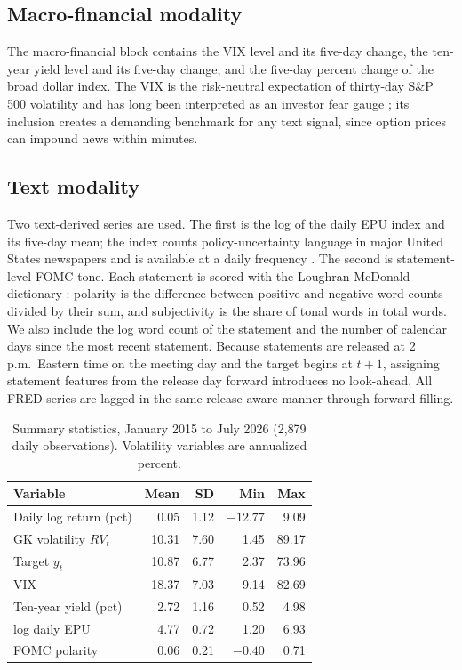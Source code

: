\documentclass[10pt,twocolumn]{article}
\begin{document}
\subsection{Macro-financial modality}
The macro-financial block contains the VIX level and its five-day change, the ten-year yield level and its five-day change, and the five-day percent change of the broad dollar index. The VIX is the risk-neutral expectation of thirty-day S\&P 500 volatility and has long been interpreted as an investor fear gauge \cite{whaley2000}; its inclusion creates a demanding benchmark for any text signal, since option prices can impound news within minutes.

\subsection{Text modality}
Two text-derived series are used. The first is the log of the daily EPU index and its five-day mean; the index counts policy-uncertainty language in major United States newspapers and is available at a daily frequency \cite{baker2016}. The second is statement-level FOMC tone. Each statement is scored with the Loughran-McDonald dictionary \cite{loughran2011}: polarity is the difference between positive and negative word counts divided by their sum, and subjectivity is the share of tonal words in total words. We also include the log word count of the statement and the number of calendar days since the most recent statement. Because statements are released at 2 p.m.\ Eastern time on the meeting day and the target begins at $t+1$, assigning statement features from the release day forward introduces no look-ahead. All FRED series are lagged in the same release-aware manner through forward-filling.

\begin{table}[t]
\centering\small
\caption{Summary statistics, January 2015 to July 2026 (2{,}879 daily observations). Volatility variables are annualized percent.}
\label{tab:summ}
\begin{tabular}{lrrrr}
\toprule
Variable & Mean & SD & Min & Max\\
\midrule
Daily log return (pct) & 0.05 & 1.12 & $-12.77$ & 9.09\\
GK volatility $RV_t$ & 10.31 & 7.60 & 1.45 & 89.17\\
Target $y_t$ & 10.87 & 6.77 & 2.37 & 73.96\\
VIX & 18.37 & 7.03 & 9.14 & 82.69\\
Ten-year yield (pct) & 2.72 & 1.16 & 0.52 & 4.98\\
log daily EPU & 4.77 & 0.72 & 1.20 & 6.93\\
FOMC polarity & 0.06 & 0.21 & $-0.40$ & 0.71\\
\bottomrule
\end{tabular}
\end{table}
\end{document}
